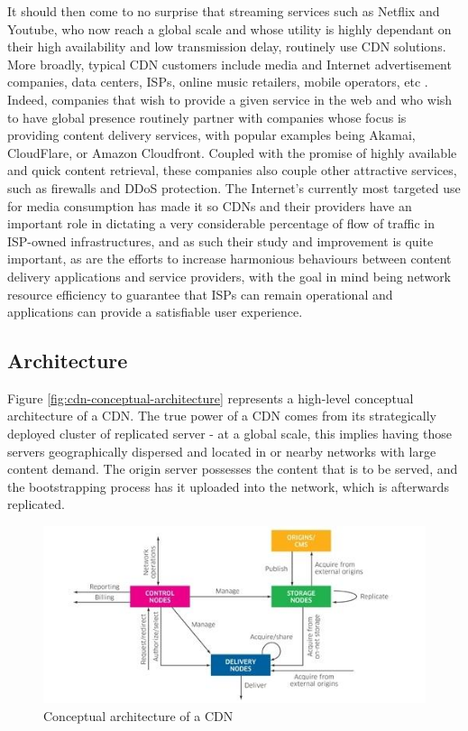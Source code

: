     It should then come to no surprise that streaming services such as Netflix and Youtube, who now reach a global scale and whose utility is highly dependant on their high availability and low transmission delay, routinely use CDN solutions.
    More broadly, typical CDN customers include media and Internet advertisement companies, data centers, ISPs, online music retailers, mobile operators, etc \cite{cdn-survey}.
    Indeed, companies that wish to provide a given service in the web and who wish to have global presence routinely partner with companies whose focus is providing content delivery services, with popular examples being Akamai, CloudFlare, or Amazon Cloudfront.
    Coupled with the promise of highly available and quick content retrieval, these companies also couple other attractive services, such as firewalls and DDoS protection.
    The Internet's currently most targeted use for media consumption has made it so CDNs and their providers have an important role in dictating a very considerable percentage of flow of traffic in ISP-owned infrastructures, and as such their study and improvement is quite important, as are the efforts to increase harmonious behaviours between content delivery applications and service providers, with the goal in mind being network resource efficiency to guarantee that ISPs can remain operational and applications can provide a satisfiable user experience.

\subsection{Architecture}

    Figure \ref{fig:cdn-conceptual-architecture} represents a high-level conceptual architecture of a CDN. The true power of a CDN comes from its strategically deployed cluster of replicated server - at a global scale, this implies having those servers geographically dispersed and located in or nearby networks with large content demand.
    The origin server possesses the content that is to be served, and the bootstrapping process has it uploaded into the network, which is afterwards replicated.

\begin{figure}[!h]
\centering
\includegraphics[scale=8.0]{img/cdn-architecture.jpg}
\caption{Conceptual architecture of a CDN \cite{cdn-survey}}
\label{fig:cdn-architecture}
\end{figure}


